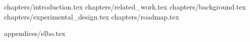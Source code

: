 \documentclass[11pt,oneside,a4paper]{book}
\renewcommand{\chaptermark}[1]{\markboth{\MakeUppercase{#1}}{}}
\begin{document}


\mainmatter

\fancyhead[RE,LO]{\thesection}

\singlespacing              %

 {chapters/introduction.tex}
 {chapters/related_work.tex}
 {chapters/background.tex}
 {chapters/experimental_design.tex}
 {chapters/roadmap.tex}

\renewcommand{\chaptermark}[1]{\markboth{\MakeUppercase{\appendixname\ \thechapter}} {\MakeUppercase{#1}} }
\fancyhead[RE,LO]{}
\appendix

\clearpage
 {appendices/elbo.tex}
\clearpage

\backmatter \singlespacing   %


\end{document}
